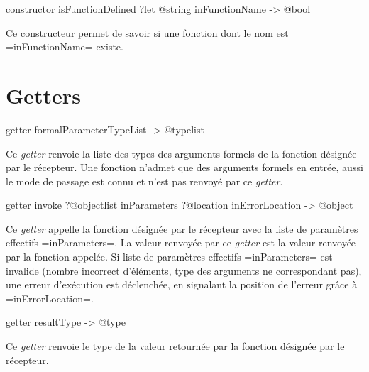 
\begin{galgas}
constructor isFunctionDefined ?let @string inFunctionName -> @bool
\end{galgas}

Ce constructeur permet de savoir si une fonction dont le nom est \ggs=inFunctionName= existe.






\section{Getters}



\begin{galgas}
getter formalParameterTypeList -> @typelist
\end{galgas}

Ce \emph{getter} renvoie la liste des types des arguments formels de la fonction désignée par le récepteur. Une fonction n'admet que des arguments formels en entrée, aussi le mode de passage est connu et n'est pas renvoyé par ce \emph{getter}.





\begin{galgas}
getter invoke ?@objectlist inParameters
              ?@location inErrorLocation -> @object
\end{galgas}

Ce \emph{getter} appelle la fonction désignée par le récepteur avec la liste de paramètres effectifs \ggs=inParameters=. La valeur renvoyée par ce \emph{getter} est la valeur renvoyée par la fonction appelée. Si liste de paramètres effectifs \ggs=inParameters= est invalide (nombre incorrect d'éléments, type des arguments ne correspondant pas), une erreur d'exécution est déclenchée, en signalant la position de l'erreur grâce à \ggs=inErrorLocation=. 






\begin{galgas}
getter resultType -> @type
\end{galgas}

Ce \emph{getter} renvoie le type de la valeur retournée par la fonction désignée par le récepteur. 





